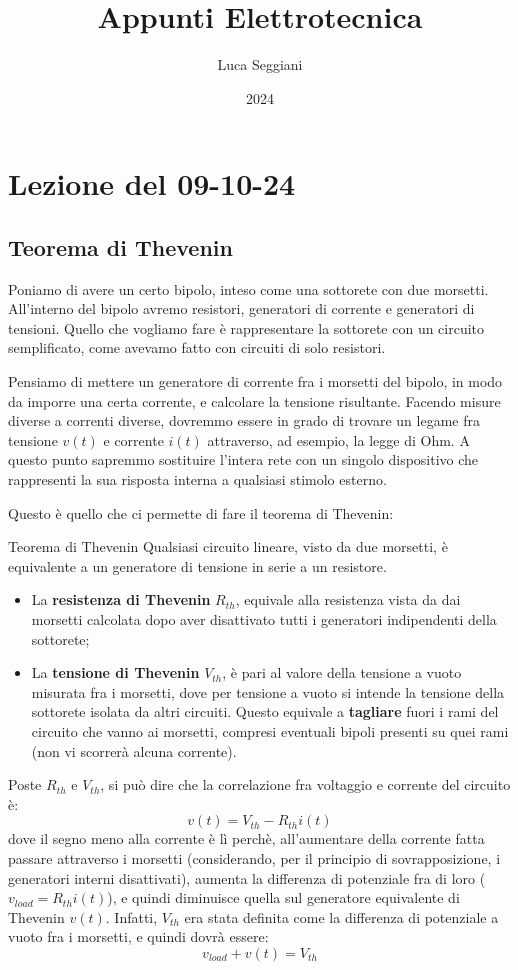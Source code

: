 \documentclass[a4paper,11pt]{article}
\title{Appunti Elettrotecnica}
\author{Luca Seggiani}
\date{2024}
\begin{document}
\section{Lezione del 09-10-24}

\thispagestyle{empty}
\pagestyle{fancy}

\subsection{Teorema di Thevenin}
Poniamo di avere un certo bipolo, inteso come una sottorete con due morsetti.
All'interno del bipolo avremo resistori, generatori di corrente e generatori di tensioni.
Quello che vogliamo fare è rappresentare la sottorete con un circuito semplificato, come avevamo fatto con circuiti di solo resistori.

Pensiamo di mettere un generatore di corrente fra i morsetti del bipolo, in modo da imporre una certa corrente, e calcolare la tensione risultante.
Facendo misure diverse a correnti diverse, dovremmo essere in grado di trovare un legame fra tensione $v(t)$ e corrente $i(t)$ attraverso, ad esempio, la legge di Ohm.
A questo punto sapremmo sostituire l'intera rete con un singolo dispositivo che rappresenti la sua risposta interna a qualsiasi stimolo esterno.

Questo è quello che ci permette di fare il teorema di Thevenin:
\begin{theorem}{Teorema di Thevenin}
	Qualsiasi circuito lineare, visto da due morsetti, è equivalente a un generatore di tensione in serie a un resistore.

\begin{itemize}
	\item La \textbf{resistenza di Thevenin} $R_{th}$, equivale alla resistenza vista da dai morsetti calcolata dopo aver disattivato tutti i generatori indipendenti della sottorete;
	\item La \textbf{tensione di Thevenin} $V_{th}$, è pari al valore della tensione a vuoto misurata fra i morsetti, dove per tensione a vuoto si intende la tensione della sottorete isolata da altri circuiti. Questo equivale a \textbf{tagliare} fuori i rami del circuito che vanno ai morsetti, compresi eventuali bipoli presenti su quei rami (non vi scorrerà alcuna corrente).
\end{itemize}
\end{theorem}

Poste $R_{th}$ e $V_{th}$, si può dire che la correlazione fra voltaggio e corrente del circuito è:
$$
v(t) = V_{th} - R_{th} i(t)
$$
dove il segno meno alla corrente è lì perchè, all'aumentare della corrente fatta passare attraverso i morsetti (considerando, per il principio di sovrapposizione, i generatori interni disattivati), aumenta la differenza di potenziale fra di loro ($v_{load} = R_{th} i(t)$), e quindi diminuisce quella sul generatore equivalente di Thevenin $v(t)$.
Infatti, $V_{th}$ era stata definita come la differenza di potenziale a vuoto fra i morsetti, e quindi dovrà essere:
$$
v_{load} + v(t) = V_{th}
$$
\end{document}
